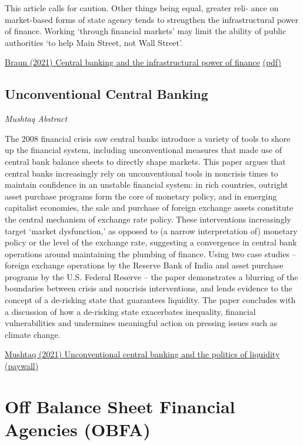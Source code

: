 \documentclass[
]{book}
\begin{document}
This article calls for caution. Other things being equal, greater reli-
ance on market-based forms of state agency tends to strengthen the infrastructural power of
finance. Working `through financial markets' may limit the ability of public authorities `to
help Main Street, not Wall Street'.

\href{https://academic.oup.com/ser/article/18/2/395/4883362}{Braun (2021) Central banking and the infrastructural power of finance}
\href{pdf/Braun_2021_Central_Banking_and_Infrastructural_Power_of_Finance.pdf}{(pdf)}

\hypertarget{unconventional-central-banking}{%
\section{Unconventional Central Banking}\label{unconventional-central-banking}}

\emph{Mushtaq Abstract}

The 2008 financial crisis saw central banks introduce a variety of tools to shore up the financial system, including unconventional measures that made use of central bank balance sheets to directly shape markets. This paper argues that central banks increasingly rely on unconventional tools in noncrisis times to maintain confidence in an unstable financial system: in rich countries, outright asset purchase programs form the core of monetary policy, and in emerging capitalist economies, the sale and purchase of foreign exchange assets constitute the central mechanism of exchange rate policy. These interventions increasingly target `market dysfunction,' as opposed to (a narrow interpretation of) monetary policy or the level of the exchange rate, suggesting a convergence in central bank operations around maintaining the plumbing of finance. Using two case studies -- foreign exchange operations by the Reserve Bank of India and asset purchase programs by the U.S. Federal Reserve -- the paper demonstrates a blurring of the boundaries between crisis and noncrisis interventions, and lends evidence to the concept of a de-risking state that guarantees liquidity. The paper concludes with a discussion of how a de-risking state exacerbates inequality, financial vulnerabilities and undermines meaningful action on pressing issues such as climate change.

\href{https://www.tandfonline.com/doi/abs/10.1080/09692290.2021.1997785}{Mushtaq (2021) Unconventional central banking and the politics of liquidity (paywall)}

\hypertarget{off-balance-sheet-financial-agencies-obfa}{%
\chapter{Off Balance Sheet Financial Agencies (OBFA)}\label{off-balance-sheet-financial-agencies-obfa}}
\end{document}
